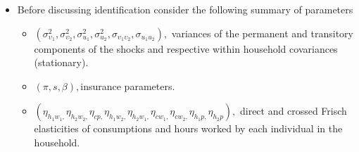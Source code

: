 \documentclass[notes=show]{beamer}
\begin{document}
\bigskip

\begin{frame}%


\begin{itemize}
\item Before discussing identification consider the following summary of
parameters

\begin{itemize}
\item $\left( \sigma _{\upsilon _{1}}^{2},\sigma _{\upsilon _{2}}^{2},\sigma
_{u_{1}}^{2},\sigma _{u_{2}}^{2},\sigma _{\upsilon _{1}\upsilon _{2}},\sigma
_{u_{1}u_{2}}\right) ,$ variances of the permanent and transitory components
of the shocks and respective within household covariances (stationary).

\item $\left( \pi ,s,\beta \right) ,$insurance parameters.

\item $\left( \eta _{h_{1}w_{1},}\eta _{h_{2}w_{2},}\eta _{cp,}\eta
_{h_{1}w_{2},}\eta _{h_{2}w_{1},}\eta _{cw_{1},}\eta _{cw_{2},}\eta
_{h_{1}p,}\eta _{h_{2}p}\right) ,$ direct and crossed Frisch elasticities of
consumptions and hours worked by each individual in the household.
\end{itemize}
\end{itemize}

\transboxout%
\end{frame}%

\bigskip
\end{document}
